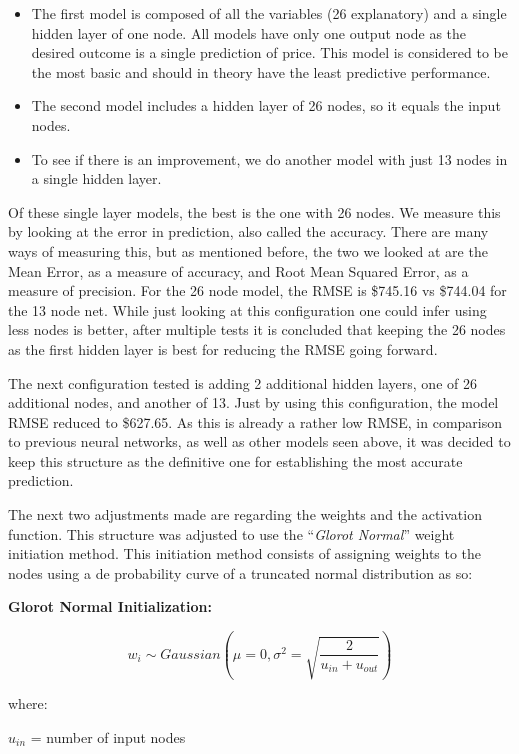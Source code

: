 \documentclass[
  paper=a4,
  ,captions=tableheading
]{scrartcl}
\begin{document}
\begin{itemize}
\item
  The first model is composed of all the variables (26 explanatory) and
  a single hidden layer of one node. All models have only one output
  node as the desired outcome is a single prediction of price. This
  model is considered to be the most basic and should in theory have the
  least predictive performance.
\item
  The second model includes a hidden layer of 26 nodes, so it equals the
  input nodes.
\item
  To see if there is an improvement, we do another model with just 13
  nodes in a single hidden layer.
\end{itemize}

Of these single layer models, the best is the one with 26 nodes. We
measure this by looking at the error in prediction, also called the
accuracy. There are many ways of measuring this, but as mentioned
before, the two we looked at are the Mean Error, as a measure of
accuracy, and Root Mean Squared Error, as a measure of precision. For
the 26 node model, the RMSE is \$745.16 vs \$744.04 for the 13 node net.
While just looking at this configuration one could infer using less
nodes is better, after multiple tests it is concluded that keeping the
26 nodes as the first hidden layer is best for reducing the RMSE going
forward.

The next configuration tested is adding 2 additional hidden layers, one
of 26 additional nodes, and another of 13. Just by using this
configuration, the model RMSE reduced to \$627.65. As this is already a
rather low RMSE, in comparison to previous neural networks, as well as
other models seen above, it was decided to keep this structure as the
definitive one for establishing the most accurate prediction.

The next two adjustments made are regarding the weights and the
activation function. This structure was adjusted to use the
``\emph{Glorot Normal}'' weight initiation method. This initiation
method consists of assigning weights to the nodes using a de probability
curve of a truncated normal distribution as so:

\textbf{Glorot Normal Initialization:}

\[w_{i} \sim Gaussian \left(\mu = 0, \sigma^{2} = \sqrt{\frac{2} {u_{in} + u_{out} }}\right)\]

where:

\(u_{in}\) = number of input nodes
\end{document}
